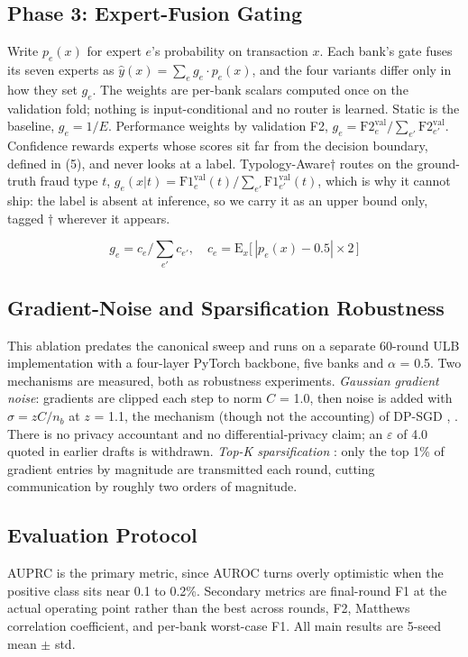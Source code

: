 \documentclass[a4paper, 10pt, conference]{ieeeconf}
\begin{document}
\subsection{Phase 3: Expert-Fusion Gating}
Write $p_e(x)$ for expert $e$'s probability on transaction $x$. Each bank's gate
fuses its seven experts as $\hat{y}(x) = \sum_e g_e \cdot p_e(x)$, and the four
variants differ only in how they set $g_e$. The weights are per-bank scalars
computed once on the validation fold; nothing is input-conditional and no router
is learned. Static is the baseline, $g_e = 1/E$. Performance weights by
validation F2, $g_e = \mathrm{F2}_e^{\mathrm{val}} / \sum_{e'}
\mathrm{F2}_{e'}^{\mathrm{val}}$. Confidence rewards experts whose scores sit far
from the decision boundary, defined in (5), and never looks at a label.
Typology-Aware$\dagger$ routes on the ground-truth fraud type $t$,
$g_e(x|t) = \mathrm{F1}_e^{\mathrm{val}}(t) / \sum_{e'}
\mathrm{F1}_{e'}^{\mathrm{val}}(t)$, which is why it cannot ship: the label is
absent at inference, so we carry it as an upper bound only, tagged $\dagger$
wherever it appears.

\begin{equation}
g_e = c_e \big/ \textstyle\sum_{e'} c_{e'}, \quad c_e = \mathrm{E}_x \bigl[ \, | p_e(x) - 0.5 | \times 2 \, \bigr]
\end{equation}

\subsection{Gradient-Noise and Sparsification Robustness}
This ablation predates the canonical sweep and runs on a separate 60-round ULB
implementation with a four-layer PyTorch backbone, five banks and
$\alpha$ = 0.5. Two mechanisms are measured, both as robustness experiments.
\emph{Gaussian gradient noise}: gradients are clipped each step to norm
$C$ = 1.0, then noise is added with $\sigma = zC/n_b$ at $z$ = 1.1, the
mechanism (though not the accounting) of DP-SGD \cite{r23}, \cite{r24}. There is
no privacy accountant and no differential-privacy claim; an $\varepsilon$ of 4.0
quoted in earlier drafts is withdrawn. \emph{Top-K sparsification} \cite{r25}:
only the top 1\% of gradient entries by magnitude are transmitted each round,
cutting communication by roughly two orders of magnitude.

\subsection{Evaluation Protocol}
AUPRC is the primary metric, since AUROC turns overly optimistic when the
positive class sits near 0.1 to 0.2\%. Secondary metrics are final-round F1 at
the actual operating point rather than the best across rounds, F2, Matthews
correlation coefficient, and per-bank worst-case F1. All main results are 5-seed
mean $\pm$ std.
\end{document}
